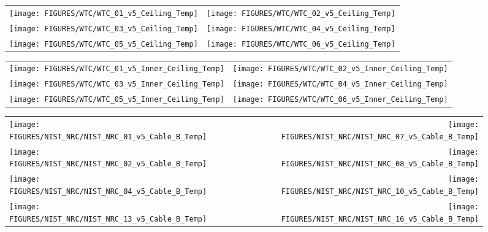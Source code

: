 \clearpage



\begin{figure}[h!]
\begin{tabular*}{\textwidth}{l@{\extracolsep{\fill}}r}
\texttt{[image: FIGURES/WTC/WTC\_01\_v5\_Ceiling\_Temp]} &
\texttt{[image: FIGURES/WTC/WTC\_02\_v5\_Ceiling\_Temp]} \\
\texttt{[image: FIGURES/WTC/WTC\_03\_v5\_Ceiling\_Temp]} &
\texttt{[image: FIGURES/WTC/WTC\_04\_v5\_Ceiling\_Temp]} \\
\texttt{[image: FIGURES/WTC/WTC\_05\_v5\_Ceiling\_Temp]} &
\texttt{[image: FIGURES/WTC/WTC\_06\_v5\_Ceiling\_Temp]}
\end{tabular*}
\label{NIST_WTC_Ceiling}
\end{figure}

\clearpage


\begin{figure}[h!]
\begin{tabular*}{\textwidth}{l@{\extracolsep{\fill}}r}
\texttt{[image: FIGURES/WTC/WTC\_01\_v5\_Inner\_Ceiling\_Temp]} &
\texttt{[image: FIGURES/WTC/WTC\_02\_v5\_Inner\_Ceiling\_Temp]} \\
\texttt{[image: FIGURES/WTC/WTC\_03\_v5\_Inner\_Ceiling\_Temp]} &
\texttt{[image: FIGURES/WTC/WTC\_04\_v5\_Inner\_Ceiling\_Temp]} \\
\texttt{[image: FIGURES/WTC/WTC\_05\_v5\_Inner\_Ceiling\_Temp]} &
\texttt{[image: FIGURES/WTC/WTC\_06\_v5\_Inner\_Ceiling\_Temp]}
\end{tabular*}
\label{NIST_WTC_Inner_Ceiling}
\end{figure}

\clearpage




\begin{figure}[h!]
\begin{tabular*}{\textwidth}{l@{\extracolsep{\fill}}r}
\texttt{[image: FIGURES/NIST\_NRC/NIST\_NRC\_01\_v5\_Cable\_B\_Temp]} &
\texttt{[image: FIGURES/NIST\_NRC/NIST\_NRC\_07\_v5\_Cable\_B\_Temp]} \\
\texttt{[image: FIGURES/NIST\_NRC/NIST\_NRC\_02\_v5\_Cable\_B\_Temp]} &
\texttt{[image: FIGURES/NIST\_NRC/NIST\_NRC\_08\_v5\_Cable\_B\_Temp]} \\
\texttt{[image: FIGURES/NIST\_NRC/NIST\_NRC\_04\_v5\_Cable\_B\_Temp]} &
\texttt{[image: FIGURES/NIST\_NRC/NIST\_NRC\_10\_v5\_Cable\_B\_Temp]} \\
\texttt{[image: FIGURES/NIST\_NRC/NIST\_NRC\_13\_v5\_Cable\_B\_Temp]} &
\texttt{[image: FIGURES/NIST\_NRC/NIST\_NRC\_16\_v5\_Cable\_B\_Temp]}
\end{tabular*}
\label{NIST_NRC_Cable_B_Closed}
\end{figure}


